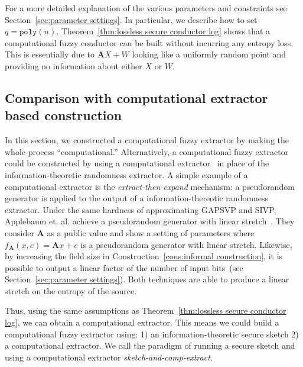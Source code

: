 \documentclass[11pt]{article}
\newcommand{\secref}[1]{\mbox{Section~\ref{#1}}}
\newcommand{\thref}[1]{\mbox{Theorem~\ref{#1}}}
\newcommand{\consref}[1]{\mbox{Construction~\ref{#1}}}
\newcommand{\vect}[1]{\ensuremath{\textbf{#1}}}
\newcommand{\poly}{\ensuremath{\mathtt{poly}}\xspace}
\newcommand{\vA}{\vect{A}}
\begin{document}
For a more detailed explanation of the various parameters and constraints see \secref{sec:parameter settings}.  In particular, we describe how to set $q = \poly(n)$.  
\thref{thm:lossless secure conductor log} shows that a computational fuzzy conductor can be built without incurring any entropy loss.  This is essentially due to $\vA X+W$ looking like a uniformly random point and providing no information about either $X$ or $W$.  

\subsection{Comparison with computational extractor based construction}
\label{sec:prg based comparison}
In this section, we constructed a computational fuzzy extractor by making the whole process ``computational.''  Alternatively, a computational fuzzy extractor could be constructed by using a computational extractor~\cite{krawczyk2010cryptographic} in place of the information-theoretic randomness extractor.  A simple example of a computational extractor is the \emph{extract-then-expand} mechanism: a pseudorandom generator is applied to the output of a information-thereotic randomness extractor. 
Under the same hardness of approximating GAPSVP and SIVP, Applebaum et. al. achieve a pseudorandom generator with linear stretch~\cite{applebaum2006pseudorandom}.  They consider $\vA$ as a public value and show a setting of parameters where $f_\vA(x, e) = \vA x + e$ is a pseudorandom generator with linear stretch.  Likewise, by increasing the field size in \consref{cons:informal construction}, it is possible to output a linear factor of the number of input bits~(see \secref{sec:parameter settings}).  Both techniques are able to produce a linear stretch on the entropy of the source.  

Thus, using the same assumptions as \thref{thm:lossless secure conductor log}, we can obtain a computational extractor.  This means we could  build a computational fuzzy extractor using: 1) an information-theoretic secure sketch 2) a computational extractor.
We call the paradigm of running a secure sketch and using a computational extractor \emph{sketch-and-comp-extract}.  
\end{document}
